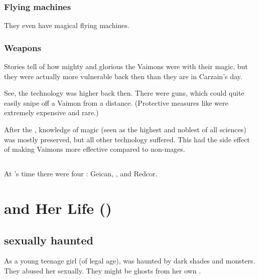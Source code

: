 \subsubsection{Flying machines}
They even have magical flying machines. 





\subsubsection{Weapons}
Stories tell of how mighty and glorious the Vaimons were with their magic, but they were actually more vulnerable back then than they are in Carzain's day. 

See, the technology was higher back then. 
There were guns, which could quite easily snipe off a Vaimon from a distance. 
(Protective measures like  were extremely expensive and rare.) 

After the \HundredScourges, knowledge of magic (seen as the highest and noblest of all sciences) was mostly preserved, but all other technology suffered. 
This had the side effect of making Vaimons more effective compared to non-mages. 









\subsection{\VaimonClans}
At \Belzir's time there were four \VaimonClans:
Geican, \Zether, \Delaen and Redcor. 















\section{\Belzir{} and Her Life ()}





\subsection{\Belzir sexually haunted}
As a young teenage girl (of legal age), \Belzir was haunted by dark shades and monsters. 
They abused her sexually. 
They might be ghosts from her own \carcer. 

